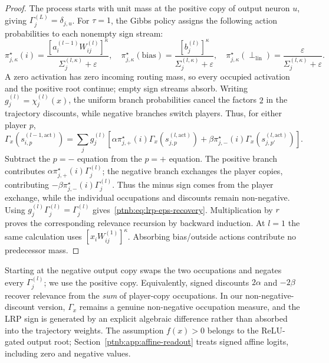 \begin{proof}
The process starts with unit mass at the positive copy of output neuron $u$, giving $\Gamma_j^{(L)}=\delta_{j,u}$. For $\tau=1$, the Gibbs policy assigns the following action probabilities to each nonempty sign stream:
\begin{equation}\label{ptnb:eq:lrp-eps-policy}
 \pi_{j,\kappa}^\star(i)=\frac{[a_i^{(l-1)}W_{ij}^{(l)}]^\kappa}{\Sigma_j^{(l,\kappa)}+\varepsilon},\quad
 \pi_{j,\kappa}^\star(\mathrm{bias})=\frac{[b_j^{(l)}]^\kappa}{\Sigma_j^{(l,\kappa)}+\varepsilon},\quad
 \pi_{j,\kappa}^\star(\perp_{\mathrm{lin}})=\frac{\varepsilon}{\Sigma_j^{(l,\kappa)}+\varepsilon}.
\end{equation}
A zero activation has zero incoming routing mass, so every occupied activation and the positive root continue; empty sign streams absorb. Writing $g_j^{(l)}=\chi_j^{(l)}(x)$, the uniform branch probabilities cancel the factors $2$ in the trajectory discounts, while negative branches switch players. Thus, for either player $p$,
\begin{equation}\label{ptnb:eq:routing-per-state-recursion}
 \Gamma_x(s_{i,p}^{(l-1,\mathrm{act})})=\sum_j g_j^{(l)}\left[
 \alpha\pi_{j,+}^\star(i)\Gamma_x(s_{j,p}^{(l,\mathrm{act})})+
 \beta\pi_{j,-}^\star(i)\Gamma_x(s_{j,p'}^{(l,\mathrm{act})})\right].
\end{equation}
Subtract the $p=-$ equation from the $p=+$ equation. The positive branch contributes $\alpha\pi_{j,+}^\star(i)\Gamma_j^{(l)}$; the negative branch exchanges the player copies, contributing $-\beta\pi_{j,-}^\star(i)\Gamma_j^{(l)}$. Thus the minus sign comes from the player exchange, while the individual occupations and discounts remain non-negative. Using $g_j^{(l)}\Gamma_j^{(l)}=\Gamma_j^{(l)}$ gives~\eqref{ptnb:eq:lrp-eps-recovery}. Multiplication by $r$ proves the corresponding relevance recursion by backward induction. At $l=1$ the same calculation uses $[x_iW_{ij}^{(1)}]^\kappa$. Absorbing bias/outside actions contribute no predecessor mass.
\end{proof}
\begin{remark}\label{ptnb:rem:starting-player}\label{ptnb:rem:signed-discount-alt}
Starting at the negative output copy swaps the two occupations and negates every $\Gamma_j^{(l)}$; we use the positive copy. Equivalently, signed discounts $2\alpha$ and $-2\beta$ recover relevance from the \emph{sum} of player-copy occupations. In our non-negative-discount version, $\Gamma_x$ remains a genuine non-negative occupation measure, and the LRP sign is generated by an explicit algebraic difference rather than absorbed into the trajectory weights.
The assumption $f(x)>0$ belongs to the ReLU-gated output root; Section~\ref{ptnb:app:affine-readout} treats signed affine logits, including zero and negative values.
\end{remark}

